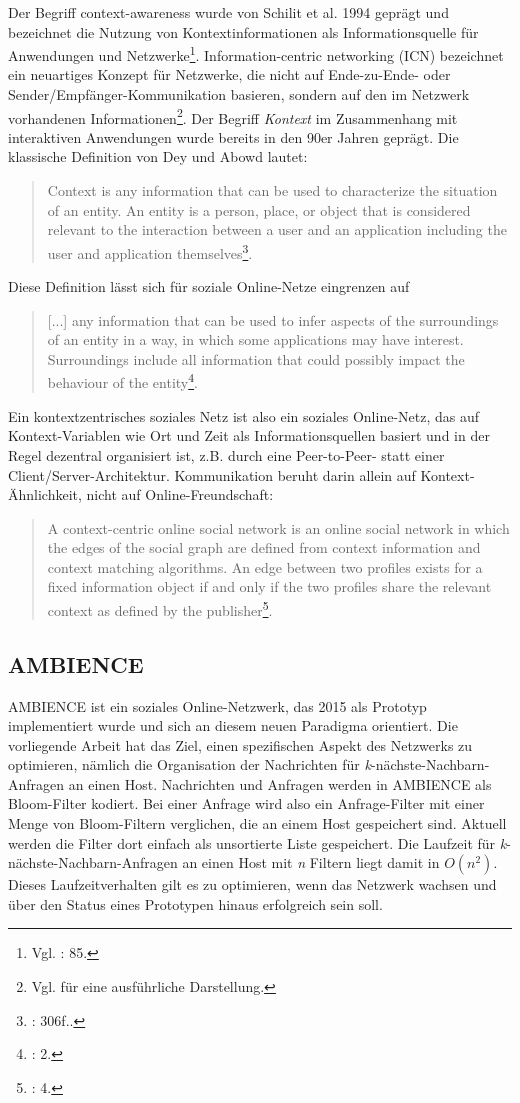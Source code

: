 Der Begriff context-awareness wurde von Schilit et al. 1994 geprägt und bezeichnet die Nutzung von Kontextinformationen als Informationsquelle für Anwendungen und Netzwerke\footnote{Vgl. \cite{Schilit1994}: 85.}. Information-centric networking (ICN) bezeichnet ein neuartiges Konzept für Netzwerke, die nicht auf Ende-zu-Ende- oder Sender/Empfänger-Kommunikation basieren, sondern auf den im Netzwerk vorhandenen Informationen\footnote{Vgl. \cite{Ahlgren2012} für eine ausführliche Darstellung.}. 
Der Begriff \textit{Kontext} im Zusammenhang mit interaktiven Anwendungen wurde bereits in den 90er Jahren geprägt. Die klassische Definition von Dey und Abowd lautet: 
\begin{quote}
Context is any information that can be used to characterize the situation of an entity. An entity is a person, place, or object that is considered relevant to the interaction between a user and an application including the user and application themselves\footnote{\cite{Dey1999}: 306f..}. 
\end{quote}
Diese Definition lässt sich für soziale Online-Netze eingrenzen auf 
\begin{quote}
[...] any information that can be used to infer aspects of the surroundings of an entity in a way, in which some applications may have interest. Surroundings include all information that could possibly impact the behaviour of the entity\footnote{\cite{Werner2015}: 2.}.
\end{quote}
Ein kontextzentrisches soziales Netz ist also ein soziales Online-Netz, das auf Kontext-Variablen wie Ort und Zeit als Informationsquellen basiert und in der Regel dezentral organisiert ist, z.B. durch eine Peer-to-Peer- statt einer Client/Server-Architektur. Kommunikation beruht darin allein auf Kontext-Ähnlichkeit, nicht auf Online-Freundschaft: 
\begin{quote}
A context-centric online social network is an online social network in which the edges of the social graph are defined from context information and context matching algorithms. An edge between two profiles exists for a fixed information object if and only if the two profiles share the relevant context as defined by the publisher\footnote{\cite{Werner2015}: 4.}.
\end{quote}
\subsection{AMBIENCE}\label{sec:ambience}
AMBIENCE ist ein soziales Online-Netzwerk, das 2015 als Prototyp implementiert wurde und sich an diesem neuen Paradigma orientiert. Die vorliegende Arbeit hat das Ziel, einen spezifischen Aspekt des Netzwerks zu optimieren, nämlich die Organisation der Nachrichten für \textit{k}-nächste-Nachbarn-Anfragen an einen Host. Nachrichten und Anfragen werden in AMBIENCE als Bloom-Filter kodiert. Bei einer Anfrage wird also ein Anfrage-Filter mit einer Menge von Bloom-Filtern verglichen, die an einem Host gespeichert sind. Aktuell werden die Filter dort einfach als unsortierte Liste gespeichert. Die Laufzeit für \textit{k}-nächste-Nachbarn-Anfragen an einen Host mit \textit{n} Filtern liegt damit in $O(n^2)$. Dieses Laufzeitverhalten gilt es zu optimieren, wenn das Netzwerk wachsen und über den Status eines Prototypen hinaus erfolgreich sein soll. 
